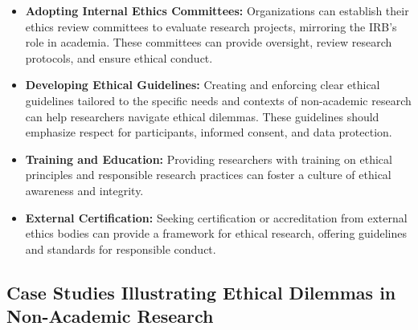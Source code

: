 \documentclass[
]{book}
\providecommand{\tightlist}{%
  \setlength{\itemsep}{0pt}\setlength{\parskip}{0pt}}
\begin{document}
\begin{itemize}
\tightlist
\item
  \textbf{Adopting Internal Ethics Committees:} Organizations can establish their ethics review committees to evaluate research projects, mirroring the IRB's role in academia. These committees can provide oversight, review research protocols, and ensure ethical conduct.
\item
  \textbf{Developing Ethical Guidelines:} Creating and enforcing clear ethical guidelines tailored to the specific needs and contexts of non-academic research can help researchers navigate ethical dilemmas. These guidelines should emphasize respect for participants, informed consent, and data protection.
\item
  \textbf{Training and Education:} Providing researchers with training on ethical principles and responsible research practices can foster a culture of ethical awareness and integrity.
\item
  \textbf{External Certification:} Seeking certification or accreditation from external ethics bodies can provide a framework for ethical research, offering guidelines and standards for responsible conduct.
\end{itemize}

\hypertarget{case-studies-illustrating-ethical-dilemmas-in-non-academic-research}{%
\subsection*{Case Studies Illustrating Ethical Dilemmas in Non-Academic Research}\label{case-studies-illustrating-ethical-dilemmas-in-non-academic-research}}
\end{document}
